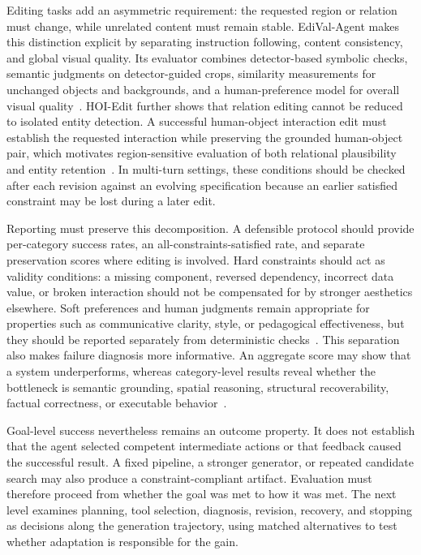 Editing tasks add an asymmetric requirement: the requested region or relation must change, while unrelated content must remain stable. EdiVal-Agent makes this distinction explicit by separating instruction following, content consistency, and global visual quality. Its evaluator combines detector-based symbolic checks, semantic judgments on detector-guided crops, similarity measurements for unchanged objects and backgrounds, and a human-preference model for overall visual quality~\cite{avg250913399}. HOI-Edit further shows that relation editing cannot be reduced to isolated entity detection. A successful human-object interaction edit must establish the requested interaction while preserving the grounded human-object pair, which motivates region-sensitive evaluation of both relational plausibility and entity retention~\cite{avg260619073}. In multi-turn settings, these conditions should be checked after each revision against an evolving specification because an earlier satisfied constraint may be lost during a later edit.

Reporting must preserve this decomposition. A defensible protocol should provide per-category success rates, an all-constraints-satisfied rate, and separate preservation scores where editing is involved. Hard constraints should act as validity conditions: a missing component, reversed dependency, incorrect data value, or broken interaction should not be compensated for by stronger aesthetics elsewhere. Soft preferences and human judgments remain appropriate for properties such as communicative clarity, style, or pedagogical effectiveness, but they should be reported separately from deterministic checks~\cite{avg260329139,avg250516832}. This separation also makes failure diagnosis more informative. An aggregate score may show that a system underperforms, whereas category-level results reveal whether the bottleneck is semantic grounding, spatial reasoning, structural recoverability, factual correctness, or executable behavior~\cite{avg250913399,avg260526144,avg260209809}.

Goal-level success nevertheless remains an outcome property. It does not establish that the agent selected competent intermediate actions or that feedback caused the successful result. A fixed pipeline, a stronger generator, or repeated candidate search may also produce a constraint-compliant artifact. Evaluation must therefore proceed from whether the goal was met to how it was met. The next level examines planning, tool selection, diagnosis, revision, recovery, and stopping as decisions along the generation trajectory, using matched alternatives to test whether adaptation is responsible for the gain.

